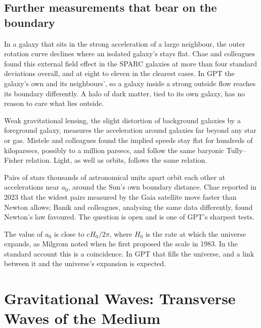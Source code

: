\subsection{Further measurements that bear on the boundary}

 In a galaxy that sits in the strong acceleration of a large neighbour, the outer rotation curve declines where an isolated galaxy's stays flat. Chae and colleagues found this external field effect in the SPARC galaxies at more than four standard deviations overall, and at eight to eleven in the clearest cases. In GPT  the galaxy's own and its neighbours', so a galaxy inside a strong outside flow reaches its boundary differently. A halo of dark matter, tied to its own galaxy, has no reason to care what lies outside.

 Weak gravitational lensing, the slight distortion of background galaxies by a foreground galaxy, measures the acceleration around galaxies far beyond any star or gas. Mistele and colleagues found the implied speeds stay flat for hundreds of kiloparsecs, possibly to a million parsecs, and follow the same baryonic Tully--Fisher relation. Light, as well as orbits, follows the same relation.

 Pairs of stars thousands of astronomical units apart orbit each other at accelerations near $a_0$, around the Sun's own boundary distance. Chae reported in 2023 that the widest pairs measured by the Gaia satellite move faster than Newton allows; Banik and colleagues, analysing the same data differently, found Newton's law favoured. The question is open and is one of GPT's sharpest tests.

 The value of $a_0$ is close to $cH_0/2\pi$, where $H_0$ is the rate at which the universe expands, as Milgrom noted when he first proposed the scale in 1983. In the standard account this is a coincidence. In GPT  that fills the universe, and a link between it and the universe's expansion is expected.

\section{Gravitational Waves: Transverse Waves of the Medium}

